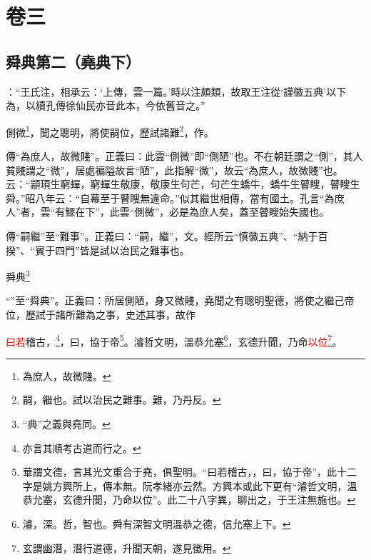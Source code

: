 

\chapter{卷三}


\section{舜典第二（堯典下）}


 {\noindent{}\fzbyks {}：“王氏注，相承云：‘上傳，雲一篇。’時以注頗類，故取王注從‘謹徽五典’以下為，以續孔傳徐仙民亦音此本，今依舊音之。” \par}

\textcolor{red}{}側微\footnote{為庶人，故微賤。}，聞之聰明，將使嗣位，歷試諸難\footnote{嗣，繼也。試以治民之難事。難，乃丹反。}，作\CJKunderwave{\textcolor{red}{舜典}}。

{\noindent\zhuan{}\fzbyks 傳“為庶人，故微賤”。正義曰：此雲“側微”即“側陋”也。不在朝廷謂之“側”，其人貧賤謂之“微”，居處褊隘故言“陋”，此指解“微”，故云“為庶人，故微賤”也。云：“顓頊生窮蟬，窮蟬生敬康，敬康生句芒，句芒生蟜牛，蟜牛生瞽瞍，瞽瞍生舜。”昭八年云：“自幕至于瞽瞍無違命。”似其繼世相傳，當有國土。孔言“為庶人”者，雲“有鰥在下”，此雲“側微”，必是為庶人矣，蓋至瞽瞍始失國也。 \par}

{\noindent\zhuan{}\fzbyks 傳“嗣繼”至“難事”。正義曰：“嗣，繼”，文。經所云“慎徽五典”、“納于百揆”、“賓于四門”皆是試以治民之難事也。 \par}

舜典\footnote{“典”之義與堯同。}

{\noindent\shu{}\fzkt “”至“舜典”。正義曰：所居側陋，身又微賤，堯聞之有聰明聖德，將使之繼己帝位，歷試于諸所難為之事，史述其事，故作 \par}

\textcolor{red}{曰若}稽古，\footnote{亦言其順考古道而行之。}，曰，協于帝\footnote{華謂文德，言其光文重合于堯，俱聖明。“曰若稽古，，曰，協于帝”，此十二字是姚方興所上，傳本無。阮孝緒亦云然。方興本或此下更有“濬哲文明，溫恭允塞，玄德升聞，乃命以位”。此二十八字異，聊出之，于王注無施也。}。濬哲文明，溫恭允塞\footnote{濬，深。哲，智也。舜有深智文明溫恭之德，信允塞上下。}，玄德升聞，乃命\textcolor{red}{以位}\footnote{玄謂幽潛，潛行道德，升聞天朝，遂見徵用。}。

